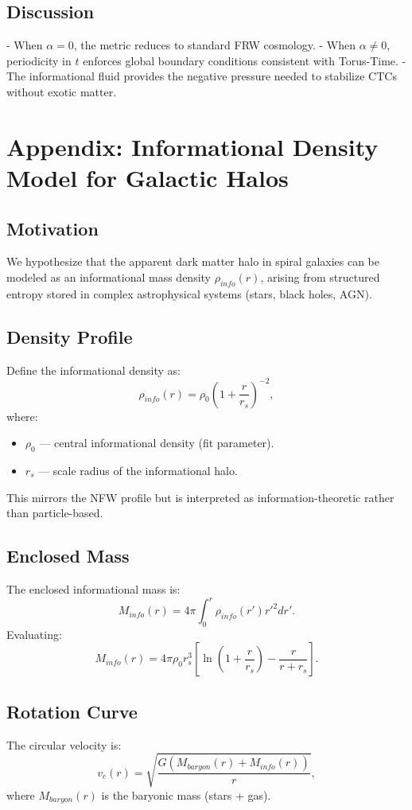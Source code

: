 \documentclass[12pt,openany]{book}
\theoremstyle{plain}
\theoremstyle{definition}
\theoremstyle{remark}
\begin{document}
\section{Discussion}
- When $\alpha=0$, the metric reduces to standard FRW cosmology.
- When $\alpha \neq 0$, periodicity in $t$ enforces global boundary conditions consistent with Torus-Time.
- The informational fluid provides the negative pressure needed to stabilize CTCs without exotic matter.

\chapter{Appendix: Informational Density Model for Galactic Halos}

\section{Motivation}
We hypothesize that the apparent dark matter halo in spiral galaxies can be modeled 
as an informational mass density $\rho_{info}(r)$, arising from structured entropy 
stored in complex astrophysical systems (stars, black holes, AGN).

\section{Density Profile}
Define the informational density as:
\[
\rho_{info}(r) = \rho_0 \left(1 + \frac{r}{r_s}\right)^{-2},
\]
where:
\begin{itemize}
    \item $\rho_0$ — central informational density (fit parameter).
    \item $r_s$ — scale radius of the informational halo.
\end{itemize}

This mirrors the NFW profile but is interpreted as information-theoretic rather than 
particle-based.

\section{Enclosed Mass}
The enclosed informational mass is:
\[
M_{info}(r) = 4\pi \int_0^r \rho_{info}(r') r'^2 dr'.
\]
Evaluating:
\[
M_{info}(r) = 4\pi \rho_0 r_s^3 \left[\ln\left(1+\frac{r}{r_s}\right) - \frac{r}{r+r_s}\right].
\]
\section{Rotation Curve}
The circular velocity is:
\[
v_c(r) = \sqrt{\frac{G \left(M_{baryon}(r) + M_{info}(r)\right)}{r}},
\]
where $M_{baryon}(r)$ is the baryonic mass (stars + gas).
\end{document}
